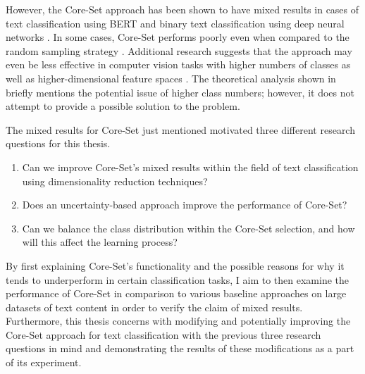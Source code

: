 \documentclass[english,bachelor,ul]{webisthesis} %
\begin{document}
However, the Core-Set approach has been shown to have mixed results in cases of text classification using BERT \citep{DBLP:conf/kdd/0002MM21, DBLP:conf/emnlp/Ein-DorHGSDCDAK20} and binary text classification using deep neural networks \citep{DBLP:conf/cikm/Liu0LZW21}. In some cases, Core-Set performs poorly even when compared to the random sampling strategy \citep{DBLP:conf/kdd/0002MM21, DBLP:conf/aaai/ColemanCKCBBNSZ22}. Additional research suggests that the approach may even be less effective in computer vision tasks with higher numbers of classes as well as higher-dimensional feature spaces \citep{DBLP:conf/iccv/SinhaED19}. The theoretical analysis shown in \cite{DBLP:conf/iclr/SenerS18} briefly mentions the potential issue of higher class numbers; however, it does not attempt to provide a possible solution to the problem.

The mixed results for Core-Set just mentioned motivated three different research questions for this thesis.

\begin{enumerate}
    \item Can we improve Core-Set's mixed results within the field of text classification using dimensionality reduction techniques?
    \item Does an uncertainty-based approach improve the performance of Core-Set?
    \item Can we balance the class distribution within the Core-Set selection, and how will this affect the learning process?
\end{enumerate}



By first explaining Core-Set's functionality and the possible reasons for why it tends to underperform in certain classification tasks, I aim to then examine the performance of Core-Set in comparison to various baseline approaches on large datasets of text content in order to verify the claim of mixed results. Furthermore, this thesis concerns with modifying and potentially improving the Core-Set approach for text classification with the previous three research questions in mind and demonstrating the results of these modifications as a part of its experiment.
\end{document}
